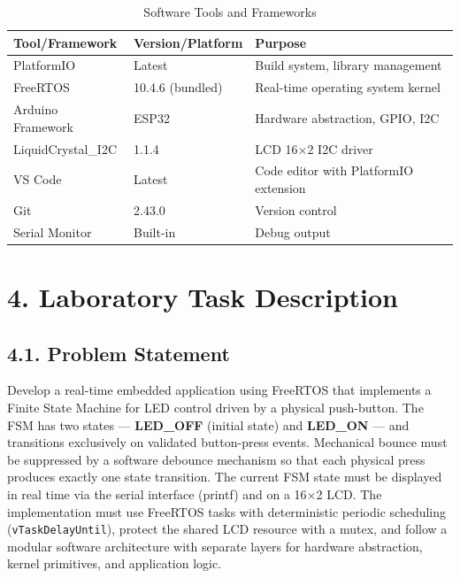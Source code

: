 \documentclass[12pt]{article}
\begin{document}
\begin{table}[H]
    \centering
    \caption{Software Tools and Frameworks}
    \label{tab:software-resources}
    \begin{tabular}{|l|l|l|}
        \hline
        \textbf{Tool/Framework} & \textbf{Version/Platform} & \textbf{Purpose} \\
        \hline
        PlatformIO & Latest & Build system, library management \\
        \hline
        FreeRTOS & 10.4.6 (bundled) & Real-time operating system kernel \\
        \hline
        Arduino Framework & ESP32 & Hardware abstraction, GPIO, I2C \\
        \hline
        LiquidCrystal\_I2C & 1.1.4 & LCD 16$\times$2 I2C driver \\
        \hline
        VS Code & Latest & Code editor with PlatformIO extension \\
        \hline
        Git & 2.43.0 & Version control \\
        \hline
        Serial Monitor & Built-in & Debug output \\
        \hline
    \end{tabular}
\end{table}

\section*{4. Laboratory Task Description}

\subsection*{4.1. Problem Statement}

Develop a real-time embedded application using FreeRTOS that implements a Finite State Machine for LED control driven by a physical push-button. The FSM has two states — \textbf{LED\_OFF} (initial state) and \textbf{LED\_ON} — and transitions exclusively on validated button-press events. Mechanical bounce must be suppressed by a software debounce mechanism so that each physical press produces exactly one state transition. The current FSM state must be displayed in real time via the serial interface (printf) and on a 16×2 LCD. The implementation must use FreeRTOS tasks with deterministic periodic scheduling (\texttt{vTaskDelayUntil}), protect the shared LCD resource with a mutex, and follow a modular software architecture with separate layers for hardware abstraction, kernel primitives, and application logic.
\end{document}
